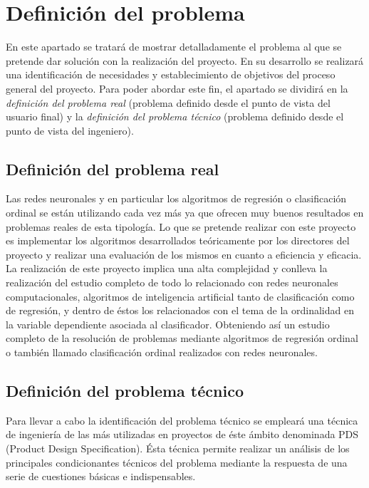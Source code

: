 \chapter{Definición del problema}
	
	En este apartado se tratará de mostrar detalladamente el problema al que se pretende dar solución con la realización del proyecto. En su desarrollo se realizará una identificación de necesidades y establecimiento de objetivos del proceso general del proyecto. Para poder abordar este fin, el apartado se dividirá en la \textit{definición del problema real} (problema definido desde el punto de vista del usuario final) y la \textit{definición del problema técnico} (problema definido desde el punto de vista del ingeniero).
	
	\section{Definición del problema real}
	
		Las redes neuronales y en particular los algoritmos de regresión o clasificación ordinal se están utilizando cada vez más ya que ofrecen muy buenos resultados en problemas reales de esta tipología. Lo que se pretende realizar con este proyecto es implementar los algoritmos desarrollados teóricamente por los directores del proyecto y realizar una evaluación de los mismos en cuanto a eficiencia y eficacia.\\

		La realización de este proyecto implica una alta complejidad y conlleva la realización del estudio completo de todo lo relacionado con redes neuronales computacionales, algoritmos de inteligencia artificial tanto de clasificación como de regresión, y dentro de éstos los relacionados con el tema de la ordinalidad en la variable dependiente asociada al clasificador. Obteniendo así un estudio completo de la resolución de problemas mediante algoritmos de regresión ordinal o también llamado clasificación ordinal realizados con redes neuronales.\\
	
	\section{Definición del problema técnico}
		
		Para llevar a cabo la identificación del problema técnico se empleará una técnica de ingeniería de las más utilizadas en proyectos de éste ámbito denominada PDS (Product Design Specification). Ésta técnica permite realizar un análisis de los principales condicionantes técnicos del problema mediante la respuesta de una serie de cuestiones básicas e indispensables.
		
